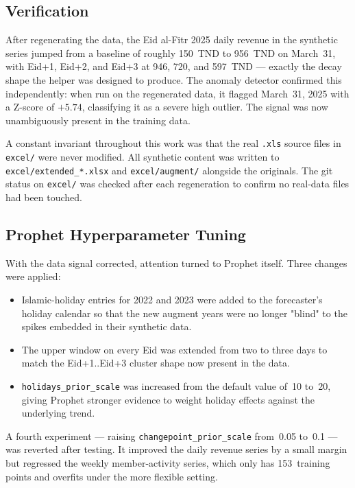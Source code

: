 \subsection{Verification}

After regenerating the data, the Eid al-Fitr 2025 daily revenue in the
synthetic series jumped from a baseline of roughly 150~TND to 956~TND on
March~31, with Eid+1, Eid+2, and Eid+3 at 946, 720, and 597~TND --- exactly
the decay shape the helper was designed to produce. The anomaly detector
confirmed this independently: when run on the regenerated data, it flagged
March~31, 2025 with a Z-score of $+5.74$, classifying it as a severe high
outlier. The signal was now unambiguously present in the training data.

A constant invariant throughout this work was that the real \texttt{.xls}
source files in \texttt{excel/} were never modified. All synthetic content
was written to \texttt{excel/extended\_*.xlsx} and \texttt{excel/augment/}
alongside the originals. The git status on \texttt{excel/} was checked after
each regeneration to confirm no real-data files had been touched.

\subsection{Prophet Hyperparameter Tuning}

With the data signal corrected, attention turned to Prophet itself. Three
changes were applied:

\begin{itemize}
  \item Islamic-holiday entries for 2022 and 2023 were added to the
        forecaster's holiday calendar so that the new augment years were
        no longer "blind" to the spikes embedded in their synthetic data.
  \item The upper window on every Eid was extended from two to three days
        to match the Eid+1..Eid+3 cluster shape now present in the data.
  \item \texttt{holidays\_prior\_scale} was increased from the default value
        of~10 to~20, giving Prophet stronger evidence to weight holiday
        effects against the underlying trend.
\end{itemize}

A fourth experiment --- raising \texttt{changepoint\_prior\_scale} from~0.05
to~0.1 --- was reverted after testing. It improved the daily revenue series
by a small margin but regressed the weekly member-activity series, which only
has 153~training points and overfits under the more flexible setting.

